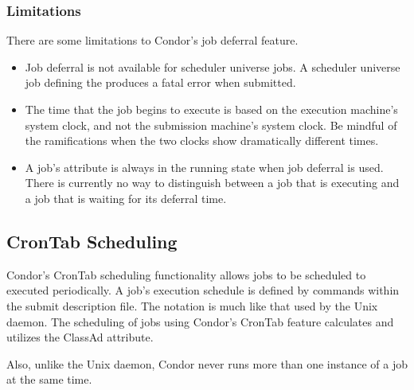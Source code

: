 \subsubsection{Limitations}
\label{sec:JobDeferral-Limitations}
There are some limitations to Condor's job deferral feature.

\begin{itemize}
\item Job deferral is not available for scheduler universe jobs.
A scheduler universe job defining the 
produces a fatal error when submitted.

\item The time that the job begins to execute 
is based on the execution machine's system clock, 
and not the submission machine's system clock. 
Be mindful of the ramifications when
the two clocks show dramatically different times.

\item A job's  attribute is always in the running state 
when job deferral is used. 
There is currently no way to distinguish between a job that is 
executing and a job that is waiting for its deferral time. 

\end{itemize}

\subsection{CronTab Scheduling}
\label{sec:CronTab}

Condor's CronTab scheduling functionality allows jobs to be 
scheduled to executed periodically. 
A job's execution schedule is defined by commands within
the submit description file.
The notation is much like that used by the Unix  daemon. 
The scheduling of jobs using Condor's CronTab feature 
calculates and utilizes
the  ClassAd attribute. 

Also, unlike the Unix  daemon, 
Condor never runs more than one instance of a job at the same time. 

